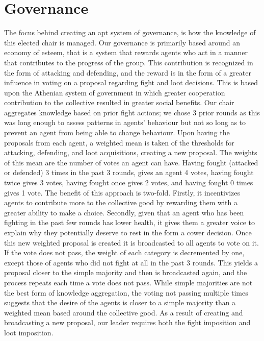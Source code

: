 \section{Governance}

\par The focus behind creating an apt system of governance, is how the knowledge of this elected chair is managed. Our governance is primarily based around an economy of esteem, that is a system that rewards agents who act in a manner that contributes to the progress of the group. This contribution is recognized in the form of attacking and defending, and the reward is in the form of a greater influence in voting on a proposal regarding fight and loot decisions. This is based upon the Athenian system of government in which greater cooperation contribution to the collective resulted in greater social benefits. Our chair aggregates knowledge based on prior fight actions; we chose 3 prior rounds as this was long enough to assess patterns in agents’ behaviour but not so long as to prevent an agent from being able to change behaviour. Upon having the proposals from each agent, a weighted mean is taken of the thresholds for attacking, defending, and loot acquisitions, creating a new proposal. The weights of this mean are the number of votes an agent can have. Having fought (attacked or defended) 3 times in the past 3 rounds, gives an agent 4 votes, having fought twice gives 3 votes, having fought once gives 2 votes, and having fought 0 times gives 1 vote. The benefit of this approach is two-fold. Firstly, it incentivizes agents to contribute more to the collective good by rewarding them with a greater ability to make a choice. Secondly, given that an agent who has been fighting in the past few rounds has lower health, it gives them a greater voice to explain why they potentially deserve to rest in the form a cower decision. Once this new weighted proposal is created it is broadcasted to all agents to vote on it. If the vote does not pass, the weight of each category is decremented by one, except those of agents who did not fight at all in the past 3 rounds. This yields a proposal closer to the simple majority and then is broadcasted again, and the process repeats each time a vote does not pass. While simple majorities are not the best form of knowledge aggregation, the voting not passing multiple times suggests that the desire of the agents is closer to a simple majority than a weighted mean based around the collective good. As a result of creating and broadcasting a new proposal, our leader requires both the fight imposition and loot imposition.

